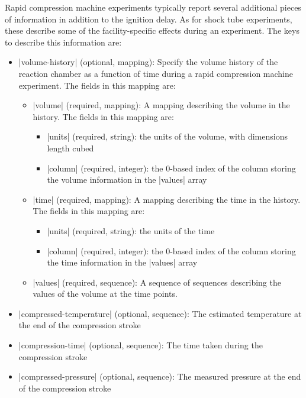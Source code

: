 \documentclass[12pt]{ijck}
\begin{document}
Rapid compression machine experiments typically report several additional pieces of information in
addition to the ignition delay. As for shock tube experiments, these describe some of the
facility-specific effects during an experiment. The keys to describe this information are:
%
\begin{itemize}
    \item \yabox|volume-history| (optional, mapping): Specify the volume history of the reaction
    chamber as a function of time during a rapid compression machine experiment. The fields in this
    mapping are:
    \begin{itemize}
        \item \yabox|volume| (required, mapping): A mapping describing the volume in the history.
        The fields in this mapping are:
        \begin{itemize}
            \item \yabox|units| (required, string): the units of the volume, with dimensions length
            cubed
            \item \yabox|column| (required, integer): the 0-based index of the column storing the
            volume information in the \yabox|values| array
        \end{itemize}
        \item \yabox|time| (required, mapping): A mapping describing the time in the history.
        The fields in this mapping are:
        \begin{itemize}
            \item \yabox|units| (required, string): the units of the time
            \item \yabox|column| (required, integer): the 0-based index of the column storing the
            time information in the \yabox|values| array
        \end{itemize}
        \item \yabox|values| (required, sequence): A sequence of sequences describing the values of
        the volume at the time points.
    \end{itemize}
    \item \yabox|compressed-temperature| (optional, sequence): The estimated temperature at the end
    of the compression stroke
    \item \yabox|compression-time| (optional, sequence): The time taken during the compression
    stroke
    \item \yabox|compressed-pressure| (optional, sequence): The measured pressure at the end of the
    compression stroke
\end{itemize}
\end{document}
